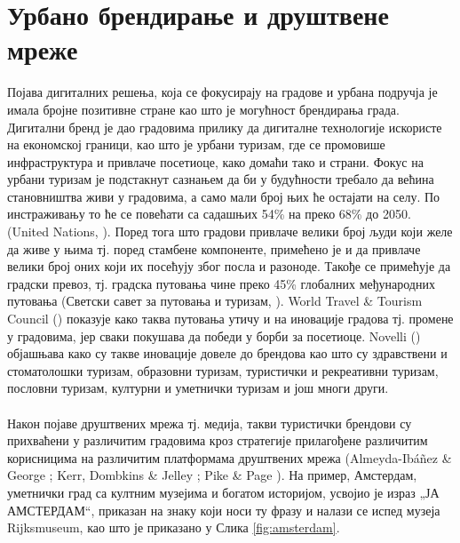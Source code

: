 \documentclass{article}
\begin{document}
\section{Урбано брендирање и друштвене мреже}
Појава дигиталних решења, која се фокусирају на градове и урбана подручја је имала бројне позитивне стране као што је могућност брендирања града. Дигитални бренд је дао градовима прилику да дигиталне технологије искористе на економској граници, као што је урбани туризам, где се промовише инфраструктура и привлаче посетиоце, како домаћи тако и страни. Фокус на урбани туризам је подстакнут сазнањем да би у будућности требало да већина становништва живи у градовима, а само мали број њих ће остајати на селу. По инстраживању то ће се повећати са садашњих 54\% на преко 68\% до 2050. (United Nations, \cite{un_2017}). Поред тога што градови привлаче велики број људи који желе да живе у њима тј. поред стамбене компоненте, примећено је и да привлаче велики број оних који их посећују због посла и разоноде. Такође се примећује да градски превоз, тј. градска путовања чине преко 45\% глобалних међународних путовања (Светски савет за путовања и туризам, \cite{wt_2018}). World Travel \& Tourism Council (\cite{wt_2018}) показује како таква путовања утичу и на иновације градова тј. промене у градовима, јер сваки покушава да победи у борби за посетиоце. Novelli (\cite{no_2005}) објашњава како су такве иновације довеле до брендова као што су здравствени и стоматолошки туризам, образовни туризам, туристички и рекреативни туризам, пословни туризам, културни и уметнички туризам и још многи други.
\\\\
Након појаве друштвених мрежа тј. медија, такви туристички брендови су прихваћени у различитим градовима кроз стратегије прилагођене различитим корисницима на различитим платформама друштвених мрежа (Almeyda-Ibáñez \& George \cite{ag_2017}; Kerr, Dombkins \& Jelley \cite{kdj_2012}; Pike \& Page \cite{pp_2014}).
На пример, Амстердам, уметнички град са култним музејима и богатом историјом, усвојио је израз „ЈА АМСТЕРДАМ“, приказан на  знаку који носи ту фразу и налази се испед музеја Rijksmuseum, као што је приказано у Слика \ref{fig:amsterdam}. 
\end{document}
